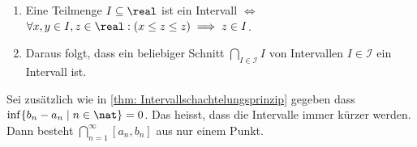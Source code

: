 \begin{ex}
  \phantom{.}
  \begin{enumerate}
    \item Eine Teilmenge $I \subseteq \real$ ist ein Intervall $\iff$ $\forall x,y \in I, z \in \real: (x \leq z \leq z) \implies z \in I$.
    \item Daraus folgt, dass ein beliebiger Schnitt $\bigcap_{I \in \mathcal{I}} I$ von Intervallen $I \in \mathcal{I}$ ein Intervall ist.
  \end{enumerate}
\end{ex}


\begin{ex}
  Sei zusätzlich wie in \ref{thm: Intervallschachtelungsprinzip} gegeben dass $\inf\{b_n-a_n \mid n \in \nat \} = 0$. Das heisst, dass die Intervalle immer kürzer werden. Dann besteht $\bigcap_{n=1}^{\infty}[a_n, b_n]$ aus nur einem Punkt.
\end{ex}

